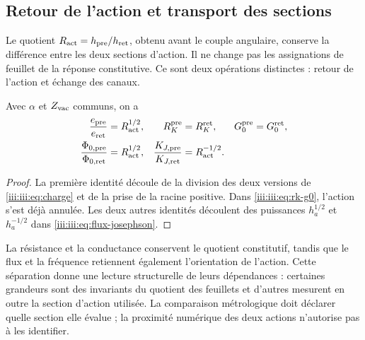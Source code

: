 \subsection{Retour de l’action et transport des sections}

Le quotient $R_{\rm act}=h_{\rm pre}/h_{\rm ret}$, obtenu avant le
couple angulaire, conserve la différence entre les deux sections d’action.
Il ne change pas les assignations de feuillet de la réponse constitutive. Ce sont deux
opérations distinctes : retour de l’action et échange des canaux.

\begin{proposition}
Avec $\alpha$ et $Z_{\rm vac}$ communs, on a
\begin{align}
 \frac{e_{\rm pre}}{e_{\rm ret}}&=R_{\rm act}^{1/2},
 &R_K^{\rm pre}&=R_K^{\rm ret},
 &G_0^{\rm pre}&=G_0^{\rm ret},\label{iii:iii:eq:charge-return}\\
 \frac{\Phi_{0,\rm pre}}{\Phi_{0,\rm ret}}&=R_{\rm act}^{1/2},
 &\frac{K_{J,\rm pre}}{K_{J,\rm ret}}&=R_{\rm act}^{-1/2}.
 \label{iii:iii:eq:flux-return}
\end{align}
\end{proposition}
\begin{proof}
La première identité découle de la division des deux versions de
\eqref{iii:iii:eq:charge} et de la prise de la racine positive. Dans
\eqref{iii:iii:eq:rk-g0}, l’action s’est déjà annulée. Les deux autres
identités découlent des puissances $h_a^{1/2}$ et $h_a^{-1/2}$ dans
\eqref{iii:iii:eq:flux-josephson}.
\end{proof}

La résistance et la conductance conservent le quotient constitutif, tandis que le flux et la fréquence retiennent également l'orientation de l'action. Cette séparation donne une lecture structurelle de leurs dépendances : certaines grandeurs sont des invariants du quotient des feuillets et d'autres mesurent en outre la section d'action utilisée. La comparaison métrologique doit déclarer quelle section elle évalue ; la proximité numérique des deux actions n'autorise pas à les identifier.
